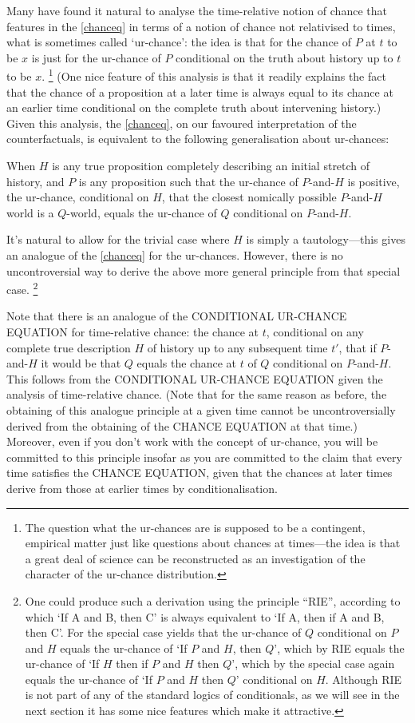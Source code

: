 \documentclass[leqno, 11pt, a5paper, openany]{article}
\begin{document}
Many have found it natural to analyse the time-relative notion of chance that features in the \ref{chanceq} in terms of a notion of chance not relativised to times, what is sometimes called ‘ur-chance’: the idea is that for the chance of $P$ at $t$ to be $x$ is just for the ur-chance of $P$ conditional on the truth about history up to $t$ to be $x$.
\footnote{The question what the ur-chances are is supposed to be a contingent, empirical matter just like questions about chances at times---the idea is that a great deal of science can be reconstructed as an investigation of the character of the ur-chance distribution.} 
(One nice feature of this analysis is that it readily explains the fact that the chance of a proposition at a later time is always equal to its chance at an earlier time conditional on the complete truth about intervening history.) Given this analysis, the \ref{chanceq}, on our favoured interpretation of the counterfactuals, is equivalent to the following generalisation about ur-chances:
\begin{prop}
	 \label{condurchanceq}
	When $H$ is any true proposition completely describing an initial stretch of history, and $P$ is any proposition such that the ur-chance of $P$-and-$H$ is positive, the ur-chance, conditional on $H$, that the closest nomically possible $P$-and-$H$ world is a $Q$-world, equals the ur-chance of $Q$ conditional on $P$-and-$H$. 
\end{prop}
It's natural to allow for the trivial case where $H$ is simply a tautology---this gives an analogue of the \ref{chanceq} for the ur-chances. However, there is no uncontroversial way to derive the above more general principle from that special case.%
\footnote{One could produce such a derivation using the principle “RIE”, according to which ‘If A and B, then C’ is always equivalent to ‘If A, then if A and B, then C’. For the special case yields that the ur-chance of $Q$ conditional on $P$ and $H$ equals the ur-chance of ‘If $P$ and $H$, then $Q$’, which by RIE equals the ur-chance of ‘If $H$ then if $P$ and $H$ then $Q$’, which by the special case again equals the ur-chance of ‘If $P$ and $H$ then $Q$’ conditional on $H$. Although RIE is not part of any of the standard logics of conditionals, as we will see in the next section it has some nice features which make it attractive.}

Note that there is an analogue of the CONDITIONAL UR-CHANCE EQUATION for time-relative chance: the chance at $t$, conditional on any complete true description $H$ of history up to any subsequent time $t'$, that if $P$-and-$H$ it would be that $Q$ equals the chance at $t$ of $Q$ conditional on $P$-and-$H$. This follows from the CONDITIONAL UR-CHANCE EQUATION given the analysis of time-relative chance. (Note that for the same reason as before, the obtaining of this analogue principle at a given time cannot be uncontroversially derived from the obtaining of the CHANCE EQUATION at that time.) Moreover, even if you don't work with the concept of ur-chance, you will be committed to this principle insofar as you are committed to the claim that every time satisfies the CHANCE EQUATION, given that the chances at later times derive from those at earlier times by conditionalisation.
\end{document}
